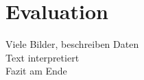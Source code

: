 \chapter{Evaluation}\label{ch:evaluation}

Viele Bilder, beschreiben Daten\\
Text interpretiert\\
Fazit am Ende \\



\begin{deprecated}
\cite{davis93}


\end{deprecated}
